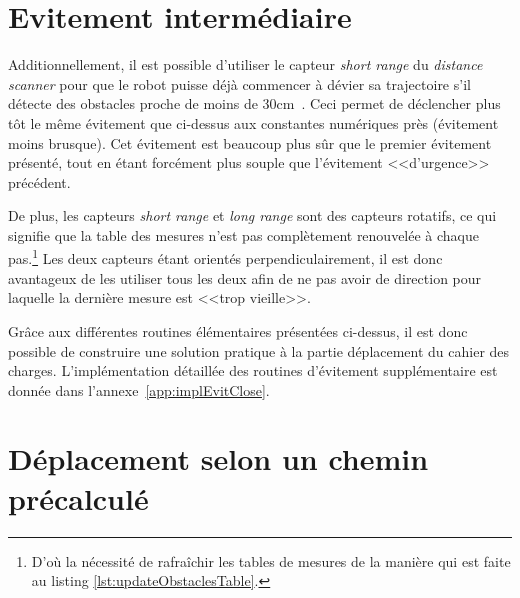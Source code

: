 \section{Evitement intermédiaire\label{sec:mediAvoid}}

Additionnellement, il est possible d'utiliser le capteur \emph{short range} du \emph{distance scanner} pour que le robot puisse déjà commencer à dévier sa trajectoire s'il détecte des obstacles proche de moins de 30cm~\cite{argosSite1}. Ceci permet de déclencher plus tôt le même évitement que ci-dessus aux constantes numériques près (évitement moins brusque). Cet évitement est beaucoup plus sûr que le premier évitement présenté, tout en étant forcément plus souple que l'évitement <<d'urgence>> précédent.

De plus, les capteurs \emph{short range} et \emph{long range} sont des capteurs rotatifs, ce qui signifie que la table des mesures n'est pas complètement renouvelée à chaque pas.\footnote{D'où la nécessité de rafraîchir les tables de mesures de la manière qui est faite au listing \ref{lst:updateObstaclesTable}.} Les deux capteurs étant orientés perpendiculairement, il est donc avantageux de les utiliser tous les deux afin de ne pas avoir de direction pour laquelle la dernière mesure est <<trop vieille>>.

\vspace{1em}
Grâce aux différentes routines élémentaires présentées ci-dessus, il est donc possible de construire une solution pratique à la partie déplacement du cahier des charges. L'implémentation détaillée des routines d'évitement supplémentaire est donnée dans l'annexe~\ref{app:implEvitClose}.

\section{Déplacement selon un chemin précalculé}

